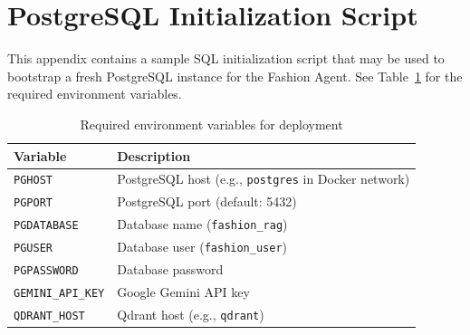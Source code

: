 \section{PostgreSQL Initialization Script}

This appendix contains a sample SQL initialization script that may be used to bootstrap a fresh PostgreSQL instance for the Fashion Agent. See Table~\ref{tab:envvars} for the required environment variables.

\begin{table}[H]
\centering
\begin{tabular}{ll}
\toprule
\textbf{Variable} & \textbf{Description}\\
\midrule
\texttt{PGHOST}            & PostgreSQL host (e.g., \texttt{postgres} in Docker network)\\
\texttt{PGPORT}            & PostgreSQL port (default: 5432)\\
\texttt{PGDATABASE}        & Database name (\texttt{fashion\_rag})\\
\texttt{PGUSER}            & Database user (\texttt{fashion\_user})\\
\texttt{PGPASSWORD}        & Database password\\
\texttt{GEMINI\_API\_KEY}  & Google Gemini API key\\
\texttt{QDRANT\_HOST}      & Qdrant host (e.g., \texttt{qdrant})\\
\bottomrule
\end{tabular}
\caption{Required environment variables for deployment}
\label{tab:envvars}
\end{table}
